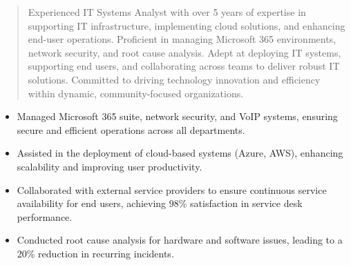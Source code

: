 



\makecvheader

\begin{quote}
  \noindent
  Experienced IT Systems Analyst with over 5 years of expertise in supporting IT infrastructure, implementing cloud solutions, and enhancing end-user operations. Proficient in managing Microsoft 365 environments, network security, and root cause analysis. Adept at deploying IT systems, supporting end users, and collaborating across teams to deliver robust IT solutions. Committed to driving technology innovation and efficiency within dynamic, community-focused organizations.
\end{quote}

\par\smallskip
\noindent
\begin{minipage}{20cm}
  \begin{minipage}{9.75cm}
    \begin{itemize}
      \item Managed Microsoft 365 suite, network security, and VoIP systems, ensuring secure and efficient operations across all departments.
      \item Assisted in the deployment of cloud-based systems (Azure, AWS), enhancing scalability and improving user productivity.
    \end{itemize}
  \end{minipage}
  \hfill
  \begin{minipage}{9.75cm}
    \begin{itemize}
      \item Collaborated with external service providers to ensure continuous service availability for end users, achieving 98\% satisfaction in service desk performance.
      \item Conducted root cause analysis for hardware and software issues, leading to a 20\% reduction in recurring incidents.
    \end{itemize}
  \end{minipage}
\end{minipage}
\par\smallskip
\divider

